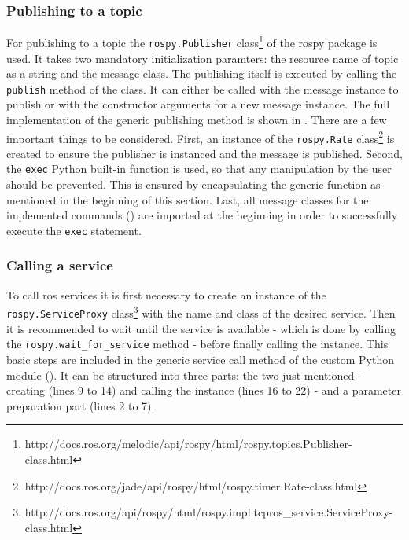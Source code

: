\subsubsection{Publishing to a topic}
For publishing to a topic the \lstinline!rospy.Publisher! class\footnote{http://docs.ros.org/melodic/api/rospy/html/rospy.topics.Publisher-class.html} of the rospy package is used. It takes two mandatory initialization paramters: the resource name of topic as a string and the message class. The publishing itself is executed by calling the \lstinline!publish! method of the class. It can either be called with the message instance to publish or with the constructor arguments for a new message instance. The full implementation of the generic publishing method is shown in . There are a few important things to be considered. First, an instance of the \lstinline!rospy.Rate! class\footnote{http://docs.ros.org/jade/api/rospy/html/rospy.timer.Rate-class.html} is created to ensure the publisher is instanced and the message is published. Second, the \lstinline!exec! Python built-in function is used, so that any manipulation by the user should be prevented. This is ensured by encapsulating the generic function as mentioned in the beginning of this section. Last, all message classes for the implemented commands () are imported at the beginning in order to successfully execute the \lstinline!exec! statement.

\begin{figure}[htbp]
	
\end{figure}

\subsubsection{Calling a service}
To call \gls{ros} services it is first necessary to create an instance of the \lstinline!rospy.ServiceProxy! class\footnote{http://docs.ros.org/api/rospy/html/rospy.impl.tcpros\_service.ServiceProxy-class.html} with the name and class of the desired service. Then it is recommended to wait until the service is available - which is done by calling the \lstinline!rospy.wait_for_service! method - before finally calling the instance. This basic steps are included in the generic service call method of the custom Python module (). It can be structured into three parts: the two just mentioned - creating (lines 9 to 14) and calling the instance (lines 16 to 22) - and a parameter preparation part (lines 2 to 7).

